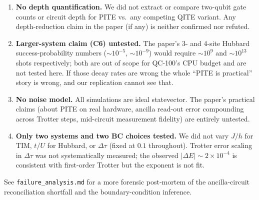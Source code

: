 \documentclass[11pt]{article}
\begin{document}
\begin{enumerate}
        time the standard QITE baseline. We therefore cannot independently
        confirm any claim about depth reduction or resource competitiveness ---
        only that the PITE curves converge as advertised.
  \item \textbf{No depth quantification.} We did not extract or compare
        two-qubit gate counts or circuit depth for PITE vs.\ any competing QITE
        variant. Any depth-reduction claim in the paper (if any) is neither
        confirmed nor refuted.
  \item \textbf{Larger-system claim (C6) untested.} The paper's 3- and 4-site
        Hubbard success-probability numbers ($\sim 10^{-5}$, $\sim 10^{-9}$)
        would require $\sim 10^9$ and $\sim 10^{13}$ shots respectively; both
        are out of scope for QC-100's CPU budget and are not tested here. If
        those decay rates are wrong the whole ``PITE is practical'' story is
        wrong, and our replication cannot see that.
  \item \textbf{No noise model.} All simulations are ideal statevector. The
        paper's practical claims (about PITE on real hardware, ancilla read-out
        error compounding across Trotter steps, mid-circuit measurement
        fidelity) are entirely untested.
  \item \textbf{Only two systems and two BC choices tested.} We did not vary
        $J/h$ for TIM, $t/U$ for Hubbard, or $\Delta\tau$ (fixed at $0.1$
        throughout). Trotter error scaling in $\Delta\tau$ was not
        systematically measured; the observed $|\Delta E| \sim 2\times 10^{-4}$
        is consistent with first-order Trotter but the exponent is not fit.
\end{enumerate}

See \texttt{failure\_analysis.md} for a more forensic post-mortem of
the ancilla-circuit reconciliation shortfall and the boundary-condition
inference.


\end{document}
